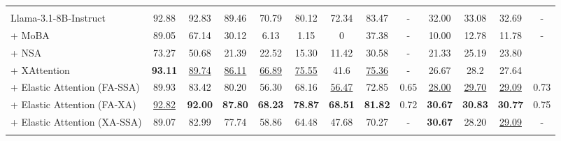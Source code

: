 \begin{table}[t]
{\begin{tabular}{l | c c c c c c | c | c | c c | c | c}
\arrayrulecolor{black}\midrule
\rowcolor{cyan!20}
\multicolumn{13}{c}{\textbf{Llama-3.1-8B-Instruct 骨干模型}} \\
\arrayrulecolor{black!20}\midrule
Llama-3.1-8B-Instruct  & 92.88 & 92.83 & 89.46 & 70.79 & 80.12 & 72.34 & 83.47 & - & 32.00 & 33.08 & 32.69 & - \\
+ MoBA & 89.05 & 67.14 & 30.12 & 6.13 & 1.15 & 0 & 37.38 & - & 10.00 & 12.78 & 11.78 & - \\
+ NSA & 73.27 & 50.68 & 21.39 & 22.52 & 15.30 & 11.42 & 30.58 & - & 21.33 & 25.19 & 23.80 \\
+ XAttention & \textbf{93.11} & \underline{89.74} & \underline{86.11} & \underline{66.89} & \underline{75.55} & 41.6 & \underline{75.36} & - & 26.67  & 28.2  & 27.64  \\
\arrayrulecolor{black!40}\midrule
+ Elastic Attention (FA-SSA) & 89.93 & 83.42 & 80.20 & 56.30 & 68.16 & \underline{56.47} & 72.85 & 0.65 & \underline{28.00} & \underline{29.70} & \underline{29.09} & 0.73\\
+ Elastic Attention (FA-XA) & \underline{92.82} & \textbf{92.00} & \textbf{87.80} & \textbf{68.23} & \textbf{78.87} & \textbf{68.51} & \textbf{81.82} & 0.72 & \textbf{30.67} & \textbf{30.83} & \textbf{30.77} & 0.75 \\
+ Elastic Attention (XA-SSA) & 89.07 & 82.99 & 77.74 & 58.86 & 64.48 & 47.68 & 70.27 & - & \textbf{30.67} & 28.20 & \underline{29.09} &  -\\

\arrayrulecolor{black}\bottomrule
\end{tabular}
}
\label{tab:ruler_lb2_result_appendix}
\end{table}
